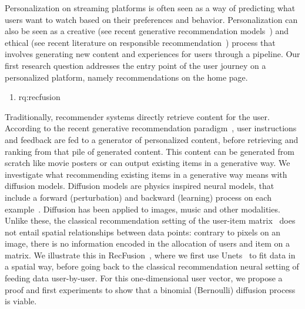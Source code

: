 Personalization on streaming platforms is often seen as a way of predicting what users want to watch based on their preferences and behavior. Personalization can also be seen as a creative (see recent generative recommendation models~\cite{llmRecNews, llmRec, genirRec}) and ethical (see recent literature on responsible recommendation~\cite{helberger, normalize, fairChatGPTReco}) process that involves generating new content and experiences for users through a pipeline. Our first research question addresses the entry point of the user journey on a personalized platform, namely recommendations on the home page.
%
\begin{enumerate}[label=\textbf{RQ\arabic*},ref={RQ\arabic*},resume,leftmargin=*]
	\item \acl{rq:recfusion}\label{rq:recfusion}
\end{enumerate}
%
Traditionally, recommender systems directly retrieve content for the user. According to the recent generative recommendation paradigm~\cite{generativeReco}, user instructions and feedback are fed to a generator of personalized content, before retrieving and ranking from that pile of generated content. This content can be generated from scratch like movie posters or can output existing items in a generative way. We investigate what recommending existing items in a generative way means with diffusion models. Diffusion models are physics inspired neural models, that include a forward (perturbation) and backward (learning) process on each example~\cite{jascha}. Diffusion has been applied to images, music and other modalities. Unlike these, the classical recommendation setting of the user-item matrix~\cite{MF} does not entail spatial relationships between data points: contrary to pixels on an image, there is no information encoded in the allocation of users and item on a matrix. We illustrate this in RecFusion~\cite{recfusion}, where we first use Unets~\cite{unet} to fit data in a spatial way, before going back to the classical recommendation neural setting of feeding data user-by-user. For this one-dimensional user vector, we propose a proof and first experiments to show that a binomial (Bernoulli) diffusion process is viable.

